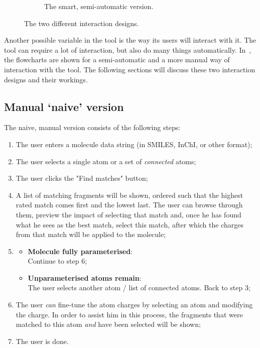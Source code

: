 \begin{figure}[h!]
\begin{subfigure}[t]{0.47\textwidth}
\caption{The smart, semi-automatic version.}
\end{subfigure}
\caption{The two different interaction designs.}
\end{figure}

Another possible variable in the tool is the way its users will interact with it. The tool can require a lot of interaction, but also do many things automatically. In~, the flowcharts are shown for a semi-automatic and a more manual way of interaction with the tool. The following sections will discuss these two interaction designs and their workings.

\subsection{Manual `naive' version}
The naive, manual version consists of the following steps:
\begin{enumerate}[itemsep=.1em, parsep=.2em, topsep=0em]
\item The user enters a molecule data string (in SMILES, InChI, or other format);
\item The user selects a single atom or a set of \emph{connected} atoms;
\item The user clicks the "Find matches" button;
\item A list of matching fragments will be shown, ordered such that the highest rated match comes first and the lowest last. The user can browse through them, preview the impact of selecting that match and, once he has found what he sees as the best match, select this match, after which the charges from that match will be applied to the molecule;
\item
\begin{itemize}[leftmargin=0cm, itemsep=.1em, parsep=.1em]
\item[] {\bf Molecule fully parameterised}:\\Continue to step 6;
\item[]{\bf Unparameterised atoms remain}:\\The user selects another atom / list of connected atoms. Back to step 3;
\end{itemize}
\item The user \emph{can} fine-tune the atom charges by selecting an atom and modifying the charge. In order to assist him in this process, the fragments that were matched to this atom \emph{and} have been selected will be shown;
\item The user is done.
\end{enumerate}

